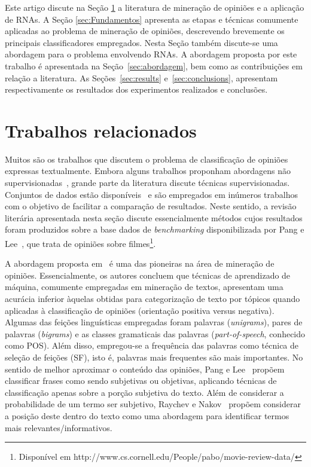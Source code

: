 \documentclass[11pt,a4paper]{article}
\begin{document}
Este artigo discute na Seção \ref{sec:RelatedWork} a literatura de mineração de opiniões e a aplicação de RNAs. A Seção \ref{sec:Fundamentos} apresenta as etapas e técnicas comumente aplicadas ao problema de mineração de opiniões, descrevendo brevemente os principais classificadores empregados. Nesta Seção também discute-se uma abordagem para o problema envolvendo RNAs. A abordagem proposta por este trabalho é apresentada na Seção~\ref{sec:abordagem}, bem como as contribuições em relação a literatura. As Seções~\ref{sec:results} e~\ref{sec:conclusions}, apresentam respectivamente os resultados dos experimentos realizados e conclusões.

\section{Trabalhos relacionados}\label{sec:RelatedWork}

Muitos são os trabalhos que discutem o problema de classificação de opiniões expressas textualmente. Embora alguns trabalhos proponham abordagens não supervisionadas~\cite{Lin:Joint,Turney:Thumbs}, grande parte da literatura discute técnicas supervisionadas. Conjuntos de dados estão disponíveis~\cite{Pang04:Subjectivity,Blitzer:Biographies} e são empregados em inúmeros trabalhos com o objetivo de facilitar a comparação de resultados. Neste sentido, a revisão literária apresentada nesta seção discute essencialmente métodos cujos resultados foram produzidos sobre a base dados de \textit{benchmarking} disponibilizada por Pang e Lee~\cite{Pang04:Subjectivity}, que trata de opiniões sobre filmes\footnote{Disponível em http://www.cs.cornell.edu/People/pabo/movie-review-data/}.

A abordagem proposta em~\cite{Pang02:ThumbsUp} é uma das pioneiras na área de mineração de opiniões. Essencialmente, os autores concluem que técnicas de aprendizado de máquina, comumente empregadas em mineração de textos, apresentam uma acurácia inferior àquelas obtidas para categorização de texto por tópicos quando aplicadas à classificação de opiniões (orientação positiva versus negativa). Algumas das feições linguísticas empregadas foram palavras (\textit{unigrams}), pares de palavras (\textit{bigrams}) e as classes gramaticais das palavras (\textit{part-of-speech}, conhecido como POS). Além disso, empregou-se a frequência das palavras como técnica de seleção de feições (SF), isto é, palavras mais frequentes são mais importantes. No sentido de melhor aproximar o conteúdo das opiniões, Pang e Lee~\cite{Pang04:Subjectivity} propõem classificar frases como sendo subjetivas ou objetivas, aplicando técnicas de classificação apenas sobre a porção subjetiva do texto. Além de considerar a probabilidade de um termo ser subjetivo, Raychev e Nakov~\cite{Raychev:Language} propõem considerar a posição deste dentro do texto como uma abordagem para identificar termos mais relevantes/informativos.
\end{document}
